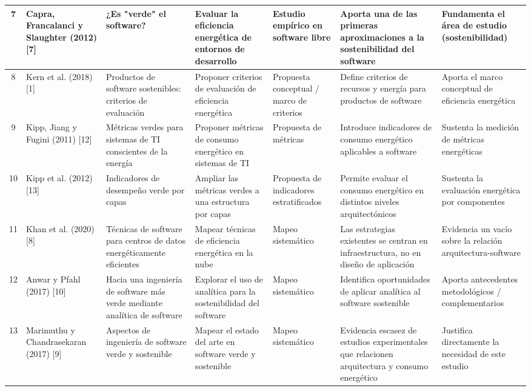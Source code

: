 \begin{table}[htbp]
\begin{tabular}{|c|l|p{3cm}|p{3cm}|p{2.5cm}|p{3.5cm}|p{3cm}|}
7 & Capra, Francalanci y Slaughter (2012) [7] & ¿Es "verde" el software? & Evaluar la eficiencia energética de entornos de desarrollo & Estudio empírico en software libre & Aporta una de las primeras aproximaciones a la sostenibilidad del software & Fundamenta el área de estudio (sostenibilidad) \\ \hline
8 & Kern et al. (2018) [1] & Productos de software sostenibles: criterios de evaluación & Proponer criterios de evaluación de eficiencia energética & Propuesta conceptual / marco de criterios & Define criterios de recursos y energía para productos de software & Aporta el marco conceptual de eficiencia energética \\ \hline
9 & Kipp, Jiang y Fugini (2011) [12] & Métricas verdes para sistemas de TI conscientes de la energía & Proponer métricas de consumo energético en sistemas de TI & Propuesta de métricas & Introduce indicadores de consumo energético aplicables a software & Sustenta la medición de métricas energéticas \\ \hline
10 & Kipp et al. (2012) [13] & Indicadores de desempeño verde por capas & Ampliar las métricas verdes a una estructura por capas & Propuesta de indicadores estratificados & Permite evaluar el consumo energético en distintos niveles arquitectónicos & Sustenta la evaluación energética por componentes \\ \hline
11 & Khan et al. (2020) [8] & Técnicas de software para centros de datos energéticamente eficientes & Mapear técnicas de eficiencia energética en la nube & Mapeo sistemático & Las estrategias existentes se centran en infraestructura, no en diseño de aplicación & Evidencia un vacío sobre la relación arquitectura-software \\ \hline
12 & Anwar y Pfahl (2017) [10] & Hacia una ingeniería de software más verde mediante analítica de software & Explorar el uso de analítica para la sostenibilidad del software & Mapeo sistemático & Identifica oportunidades de aplicar analítica al software sostenible & Aporta antecedentes metodológicos / complementarios \\ \hline
13 & Marimuthu y Chandrasekaran (2017) [9] & Aspectos de ingeniería de software verde y sostenible & Mapear el estado del arte en software verde y sostenible & Mapeo sistemático & Evidencia escasez de estudios experimentales que relacionen arquitectura y consumo energético & Justifica directamente la necesidad de este estudio \\ \hline
\end{tabular}
\end{table}


